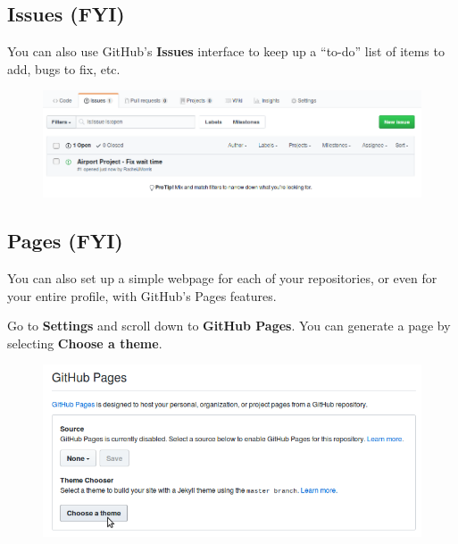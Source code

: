 \documentclass[a4paper,12pt,oneside]{book}
\begin{document}
    \hrulefill

    \subsection{Issues (FYI)}

        You can also use GitHub's \textbf{Issues} interface to keep
        up a ``to-do'' list of items to add, bugs to fix, etc.

        \begin{figure}[h]
            \centering
            \includegraphics[width=14cm]{images/github-issues.png}
        \end{figure}

    \newpage

    \subsection{Pages (FYI)}

        You can also set up a simple webpage for each of your repositories,
        or even for your entire profile, with GitHub's Pages features.

        Go to \textbf{Settings} and scroll down to \textbf{GitHub Pages}.
        You can generate a page by selecting \textbf{Choose a theme}.

        \begin{figure}[h]
            \centering
            \includegraphics[width=14cm]{images/github-pages.png}
        \end{figure}
\end{document}
